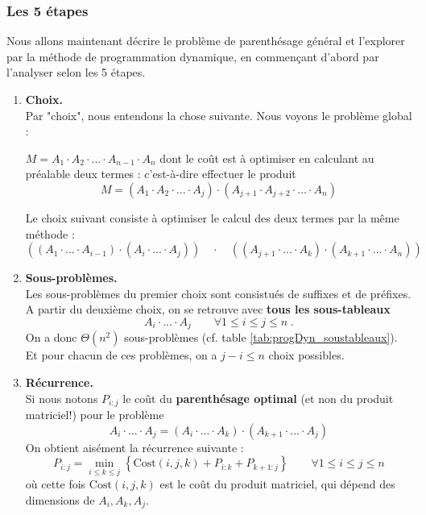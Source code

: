 \documentclass[12pt,a4paper]{book}
\begin{document}
\subsubsection{Les 5 étapes}
Nous allons maintenant décrire le problème de parenthésage général et l'explorer par la méthode de programmation dynamique, en commençant d'abord par l'analyser selon les 5 étapes. \\
\begin{enumerate}
\item \textbf{Choix.} \\
Par "choix", nous entendons la chose suivante. Nous voyons le problème global :
\leftbar[0.9\textwidth]
\begin{center}
$M = A_1 \cdot A_2 \cdot ... \cdot A_{n-1} \cdot A_n$ dont le coût est à optimiser en calculant au préalable deux termes : c'est-à-dire effectuer le produit 
$$M = (A_1 \cdot A_2 \cdot ... \cdot A_j)\cdot (A_{j+1} \cdot A_{j+2} \cdot ...  \cdot A_n)$$
\end{center}
\endleftbar
Le choix suivant consiste à optimiser le calcul des deux termes par la même méthode :
$$((A_1 \cdot ... \cdot A_{i-1}) \cdot (A_i \cdot ... \cdot A_j))\quad \cdot \quad ((A_{j+1} \cdot ... \cdot A_{k}) \cdot (A_{k+1} \cdot ... \cdot A_{n}))$$

\item \textbf{Sous-problèmes.} \\
Les sous-problèmes du premier choix sont consistués de suffixes et de préfixes. A partir du deuxième choix, on se retrouve avec \textbf{tous les sous-tableaux} $$A_i \cdot ... \cdot A_j \qquad \forall 1 \leq i \leq j \leq n \; .$$
On a donc $\Theta(n^2)$ sous-problèmes (cf. table \ref{tab:progDyn_soustableaux}). Et pour chacun de ces problèmes, on a $j-i \leq n$ choix possibles. \\

\item \textbf{Récurrence.} \\
Si nous notons $P_{i:j}$ le coût du \textbf{parenthésage optimal} (et non du produit matriciel!) pour le problème 
$$A_i \cdot ... \cdot A_j = (A_i \cdot ... \cdot A_k) \cdot (A_{k+1} \cdot ... \cdot A_j)$$
On obtient aisément la récurrence suivante :
$$P_{i:j} = \min_{i\leq k \leq j} \left\{ \text{Cost}(i,j,k) + P_{i:k} + P_{k+1:j} \right\} \qquad \forall 1 \leq i \leq j \leq n $$
où cette fois $\text{Cost}(i,j,k)$ est le coût du produit matriciel, qui dépend des dimensions de $A_i,A_k, A_j$. \\


\end{enumerate}
\end{document}
